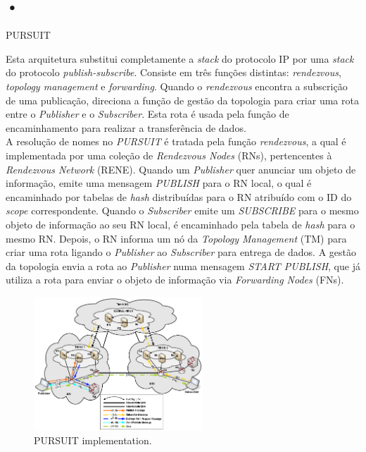 \documentclass[conference]{IEEEtran}
\begin{document}
\subsection{•}{PURSUIT}

Esta arquitetura substitui completamente a \textit{stack} do protocolo IP por uma \textit{stack} do protocolo \textit{publish-subscribe}. Consiste em tr\^{e}s fun\c{c}\~{o}es distintas: \textit{rendezvous}, \textit{topology management} e \textit{forwarding}.
Quando o \textit{rendezvous} encontra a subscri\c{c}\~{a}o de uma publica\c{c}\~{a}o, direciona a fun\c{c}\~{a}o de gest\~{a}o da topologia para criar uma rota entre o \textit{Publisher} e o \textit{Subscriber}. Esta rota \'{e} usada pela fun\c{c}\~{a}o de encaminhamento para realizar a transfer\^{e}ncia de dados.\\

A resolu\c{c}\~{a}o de nomes no \textit{PURSUIT} \'{e} tratada pela fun\c{c}\~{a}o \textit{rendezvous}, a qual \'{e} implementada por uma cole\c{c}\~{a}o de \textit{Rendezvous Nodes} (RNs), pertencentes \`{a} \textit{Rendezvous Network} (RENE). Quando um \textit{Publisher} quer anunciar um objeto de informa\c{c}\~{a}o, emite uma mensagem \textit{PUBLISH} para o RN local, o qual \'{e} encaminhado por tabelas de \textit{hash} distribu\'{i}das para o RN atribu\'{i}do com o ID do \textit{scope} correspondente. Quando o \textit{Subscriber} emite um \textit{SUBSCRIBE} para o mesmo objeto de informa\c{c}\~{a}o ao seu RN local, \'{e} encaminhado pela tabela de \textit{hash} para o mesmo RN. Depois, o RN informa um n\'{o} da \textit{Topology Management} (TM) para criar uma rota ligando o \textit{Publisher} ao \textit{Subscriber} para entrega de dados. A gest\~{a}o da topologia envia a rota ao \textit{Publisher} numa mensagem \textit{START PUBLISH}, que j\'{a} utiliza a rota para enviar o objeto de informa\c{c}\~{a}o via \textit{Forwarding Nodes} (FNs).\\

\begin{figure}[h]
\centering
\includegraphics[width=2.5in]{pursuit}
\caption{PURSUIT implementation.}
\label{pursuit}
\end{figure}
\end{document}
